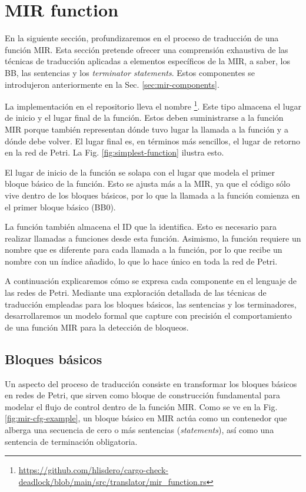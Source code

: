 \section{MIR function}

En la siguiente sección, profundizaremos en el proceso de traducción de una función \acrshort{MIR}.
Esta sección pretende ofrecer una comprensión exhaustiva de las técnicas de traducción aplicadas a
elementos específicos de la \acrshort{MIR}, a saber, los \acrfull{BB}, las sentencias y los
\textit{terminator statements}. Estos componentes se introdujeron anteriormente en la Sec. \ref{sec:mir-components}.

La implementación en el repositorio lleva el nombre
\footnote{\url{https://github.com/hlisdero/cargo-check-deadlock/blob/main/src/translator/mir_function.rs}}.
Este tipo almacena el lugar de inicio y el lugar final de la función. Estos deben suministrarse a la función
\acrshort{MIR} porque también representan dónde tuvo lugar la llamada a la función y a dónde debe
volver. El lugar final es, en términos más sencillos, el lugar de retorno en la red de Petri.
La Fig. \ref{fig:simplest-function} ilustra esto.

El lugar de inicio de la función se solapa con el lugar que modela el primer bloque básico de la
función. Esto se ajusta más a la \acrshort{MIR}, ya que el código sólo vive dentro de los bloques básicos,
por lo que la llamada a la función comienza en el primer bloque básico (BB0).

La función  también almacena el ID que la identifica.
Esto es necesario para realizar llamadas a funciones desde esta función.
Asimismo, la función requiere un nombre que es
diferente para cada llamada a la función, por lo que recibe un nombre con un índice añadido,
lo que lo hace único en toda la red de Petri.

A continuación explicaremos cómo se expresa cada componente en el lenguaje de las redes de
Petri. Mediante una exploración detallada de las técnicas de traducción empleadas para los
bloques básicos, las sentencias y los terminadores, desarrollaremos un modelo formal que
capture con precisión el comportamiento de una función \acrshort{MIR} para la detección de bloqueos.

\subsection{Bloques básicos}

Un aspecto del proceso de traducción consiste en transformar los bloques básicos en redes de
Petri, que sirven como bloque de construcción fundamental para modelar el flujo de control
dentro de la función \acrshort{MIR}. Como se ve en la Fig. \ref{fig:mir-cfg-example},
un bloque básico en \acrshort{MIR} actúa como un contenedor
que alberga una secuencia de cero o más sentencias (\emph{statements}), así como una sentencia de
terminación obligatoria.


